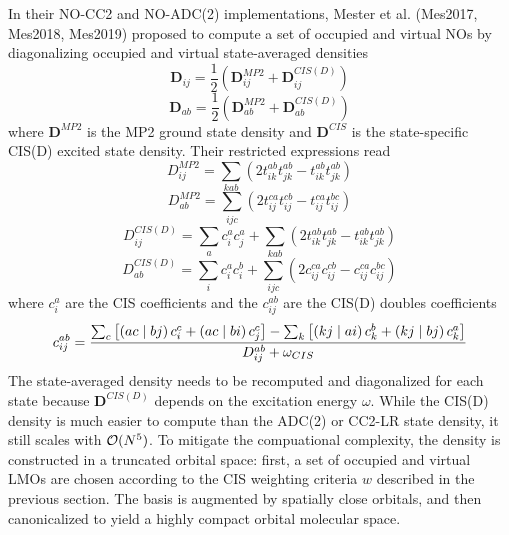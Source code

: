 In their NO-CC2 and NO-ADC(2) implementations, Mester et al. (Mes2017, Mes2018, Mes2019) proposed to compute a set of occupied and virtual NOs by diagonalizing occupied and virtual state-averaged densities
\begin{equation}
\mathbf{D}_{ij} = \frac{1}{2} \left( \mathbf{D}_{ij}^{MP2} + \mathbf{D}_{ij}^{CIS(D)} \right)
\end{equation}
\begin{equation}
\mathbf{D}_{ab} = \frac{1}{2} \left( \mathbf{D}_{ab}^{MP2} + \mathbf{D}_{ab}^{CIS(D)} \right)
\end{equation}
\noindent where $\mathbf{D}^{MP2}$ is the MP2 ground state density and $\mathbf{D}^{CIS}$ is the state-specific CIS(D) excited state density. Their restricted expressions read
\begin{equation}
D_{ij}^{MP2} = \sum_{kab} \left( 2 t_{ik}^{ab} t_{jk}^{ab} - t_{ik}^{ab} t_{jk}^{ab} \right) 
\end{equation}
\begin{equation}
D_{ab}^{MP2} = \sum_{ijc} \left( 2t_{ij}^{ca} t_{ij}^{cb} - t_{ij}^{ca}t_{ij}^{bc} \right)
\end{equation}
\begin{equation}
D_{ij}^{CIS(D)} = \sum_{a} c_i^a c_j^a  + \sum_{kab} \left( 2 t_{ik}^{ab} t_{jk}^{ab} - t_{ik}^{ab} t_{jk}^{ab} \right) 
\end{equation}
\begin{equation}
D_{ab}^{CIS(D)} = \sum_{i} c_i^a c_i^b + \sum_{ijc} \left( 2c_{ij}^{ca} c_{ij}^{cb} - c_{ij}^{ca}c_{ij}^{bc} \right)
\end{equation}
\noindent where $c_i^a$ are the CIS coefficients and the $c_{ij}^{ab}$ are the CIS(D) doubles coefficients
\begin{equation}
c_{ij}^{ab} = \frac{\sum_c \left[ \left( ac \mid bj \right) c_i^c + \left( ac \mid bi \right) c_j^c \right] - \sum_k \left[ \left( kj \mid ai \right) c_k^b + \left( kj \mid bj \right) c_k^a \right]}{D_{ij}^{ab} + \omega_{CIS}}
\end{equation}
\noindent The state-averaged density needs to be recomputed and diagonalized for each state because $\mathbf{D}^{CIS(D)}$ depends on the excitation energy $\omega$. While the CIS(D) density is much easier to compute than the ADC(2) or CC2-LR state density, it still scales with $\mathcal{O}(N^{5})$. To mitigate the compuational complexity, the density is constructed in a truncated orbital space: first, a set of occupied and virtual LMOs are chosen according to the CIS weighting criteria $w$ described in the previous section. The basis is augmented by spatially close orbitals, and then canonicalized to yield a highly compact orbital molecular space. 


